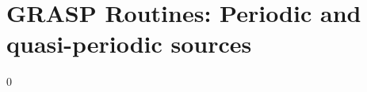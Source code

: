 \section{GRASP Routines: Periodic and quasi-periodic sources}
\label{s:periodic}
\setcounter{equation}0
